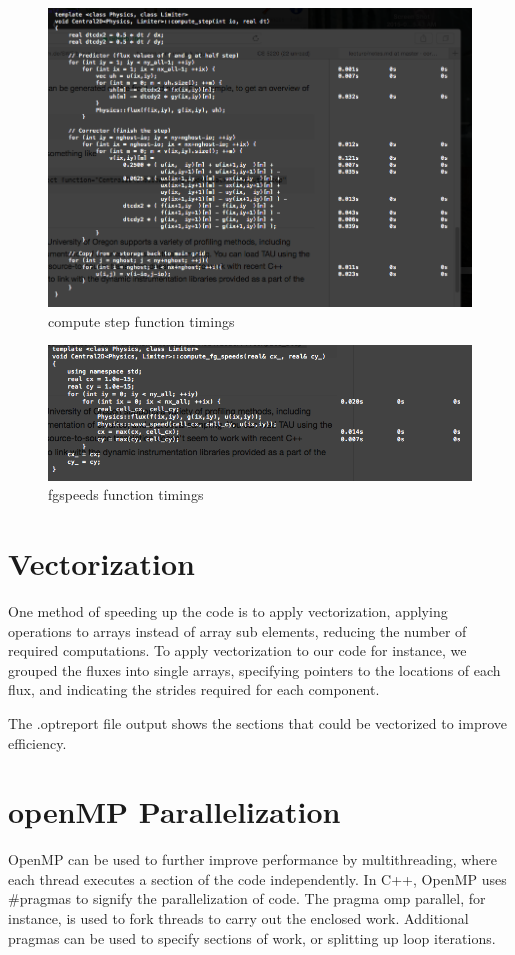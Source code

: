 \documentclass{article}
\begin{document}
 \begin{figure}[here]
  \centering
  \includegraphics[width=0.8\linewidth]{vtune_origcode_computestep.png}
  \caption{compute step function timings}
  \label{fig2}
\end{figure}

\begin{figure}[here]
  \centering
  \includegraphics[width=0.8\linewidth]{compute_fgspeeds_orig_vtune.png}
  \caption{fgspeeds function timings}
  \label{fig3}
\end{figure}

\section*{Vectorization}

One method of speeding up the code is to apply vectorization, applying operations to arrays instead of array sub elements, reducing the number of required computations. To apply vectorization to our code for instance, we grouped the fluxes into single arrays, specifying pointers to the locations of each flux, and indicating the strides required for each component.   

The .optreport file output shows the sections that could be vectorized to improve efficiency. 

\section*{openMP Parallelization}
OpenMP can be used to further improve performance by multithreading, where each thread executes a section of the code independently. In C++, OpenMP uses \#pragmas to signify the parallelization of code. The pragma omp parallel, for instance, is used to fork threads to carry out the enclosed work. Additional pragmas can be used to specify sections of work, or splitting up loop iterations. 
\end{document}

